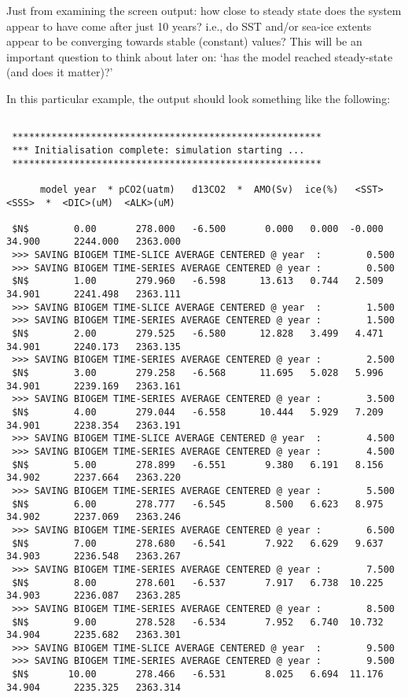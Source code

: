 \documentclass[11pt,fleqn]{book} %
\begin{document}
Just from examining the screen output: how close to steady state does the system appear to have come after just 10 years? i.e., do SST and/or sea-ice extents appear to be converging towards stable (constant) values? This will be an important question to think about later on: ‘has the model reached steady-state (and does it matter)?’

In this particular example, the output should look something like the following:

\newpage

\footnotesize
\begin{verbatim}

 *******************************************************
 *** Initialisation complete: simulation starting ...
 *******************************************************

      model year  * pCO2(uatm)   d13CO2  *  AMO(Sv)  ice(%)   <SST>   <SSS>  *  <DIC>(uM)  <ALK>(uM)

 $N$        0.00       278.000   -6.500       0.000   0.000  -0.000  34.900      2244.000   2363.000
 >>> SAVING BIOGEM TIME-SLICE AVERAGE CENTERED @ year  :        0.500
 >>> SAVING BIOGEM TIME-SERIES AVERAGE CENTERED @ year :        0.500
 $N$        1.00       279.960   -6.598      13.613   0.744   2.509  34.901      2241.498   2363.111
 >>> SAVING BIOGEM TIME-SLICE AVERAGE CENTERED @ year  :        1.500
 >>> SAVING BIOGEM TIME-SERIES AVERAGE CENTERED @ year :        1.500
 $N$        2.00       279.525   -6.580      12.828   3.499   4.471  34.901      2240.173   2363.135
 >>> SAVING BIOGEM TIME-SERIES AVERAGE CENTERED @ year :        2.500
 $N$        3.00       279.258   -6.568      11.695   5.028   5.996  34.901      2239.169   2363.161
 >>> SAVING BIOGEM TIME-SERIES AVERAGE CENTERED @ year :        3.500
 $N$        4.00       279.044   -6.558      10.444   5.929   7.209  34.901      2238.354   2363.191
 >>> SAVING BIOGEM TIME-SLICE AVERAGE CENTERED @ year  :        4.500
 >>> SAVING BIOGEM TIME-SERIES AVERAGE CENTERED @ year :        4.500
 $N$        5.00       278.899   -6.551       9.380   6.191   8.156  34.902      2237.664   2363.220
 >>> SAVING BIOGEM TIME-SERIES AVERAGE CENTERED @ year :        5.500
 $N$        6.00       278.777   -6.545       8.500   6.623   8.975  34.902      2237.069   2363.246
 >>> SAVING BIOGEM TIME-SERIES AVERAGE CENTERED @ year :        6.500
 $N$        7.00       278.680   -6.541       7.922   6.629   9.637  34.903      2236.548   2363.267
 >>> SAVING BIOGEM TIME-SERIES AVERAGE CENTERED @ year :        7.500
 $N$        8.00       278.601   -6.537       7.917   6.738  10.225  34.903      2236.087   2363.285
 >>> SAVING BIOGEM TIME-SERIES AVERAGE CENTERED @ year :        8.500
 $N$        9.00       278.528   -6.534       7.952   6.740  10.732  34.904      2235.682   2363.301
 >>> SAVING BIOGEM TIME-SLICE AVERAGE CENTERED @ year  :        9.500
 >>> SAVING BIOGEM TIME-SERIES AVERAGE CENTERED @ year :        9.500
 $N$       10.00       278.466   -6.531       8.025   6.694  11.176  34.904      2235.325   2363.314


\end{verbatim}
\end{document}
